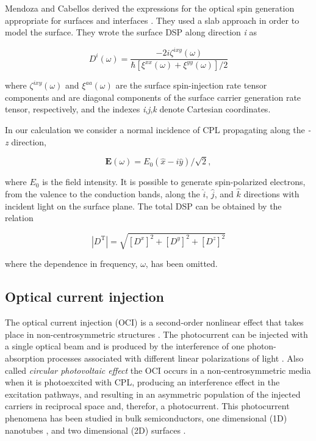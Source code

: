 \documentclass[aps,pra,11pt,tightenlines,showpacs,superscriptaddress,groupedaddress]{revtex4-1}
\begin{document}
Mendoza and Cabellos derived the expressions for the optical spin generation
appropriate for surfaces and interfaces \cite{mendoza2012optical}. They used a
slab approach in order to model the surface. They wrote the surface DSP along
direction \emph{i} as

\begin{equation}
    D^{i}(\omega) = \frac{-2i \zeta^{ixy} (\omega)}{\hbar \left[
    \xi^{xx}(\omega) + \xi^{yy}(\omega) \right] /2 } \label{eq:D^i}
\end{equation}

\noindent where $\zeta^{ixy} (\omega)$ and $\xi^{aa}(\omega)$ are the surface
spin-injection rate tensor components and are diagonal components of the
surface carrier generation rate tensor, respectively, and the indexes
\emph{i},\emph{j},\emph{k} denote Cartesian coordinates.

In our calculation we consider a normal incidence of CPL propagating along the
\emph{-z} direction,

\begin{equation*}
    \mathbf{E} (\omega) = E_{0}(\hat{x} -i \hat{y})/\sqrt{2}, 
\end{equation*}


\noindent where $E_{0}$ is the field intensity.  It is 
possible to generate spin-polarized electrons, from the valence to the
conduction bands, along the $\hat{i}$, $\hat{j}$, and $\hat{k}$ directions with
incident light on the surface plane. The total DSP can be obtained by the
relation

\begin{equation*}
    |{D^{\text{T}}}| = \sqrt{ \left[ D^{x} \right]^{2} + \left[ D^{y}
    \right]^{2} + \left[ D^{z} \right]^{2} }
\end{equation*}

\noindent where the dependence in frequency, $\omega$, has been omitted.

    \subsection{Optical current injection}

The optical current injection (OCI) is a second-order nonlinear effect that
takes place in non-centrosymmetric structures \cite{nastos2006optical,
cabellos2011optical,bhat2005excitonic,fraser1999quantum}. The photocurrent can
be injected with a single optical beam and is produced by the interference of
one photon-absorption processes associated with different linear polarizations
of light \cite{sipe2000second}. Also called  \emph{circular photovoltaic
effect} the OCI occurs in a non-centrosymmetric media when it is photoexcited
with CPL, producing an interference effect in the excitation pathways, and
resulting in an asymmetric population of the injected carriers in reciprocal
space and, therefor, a photocurrent. This photocurrent phenomena has been
studied in bulk semiconductors, one dimensional (1D) nanotubes
\cite{mele2000coherent,kral2000photogalvanic}, and two dimensional (2D)
surfaces \cite{mele2000coherent}.
\end{document}
